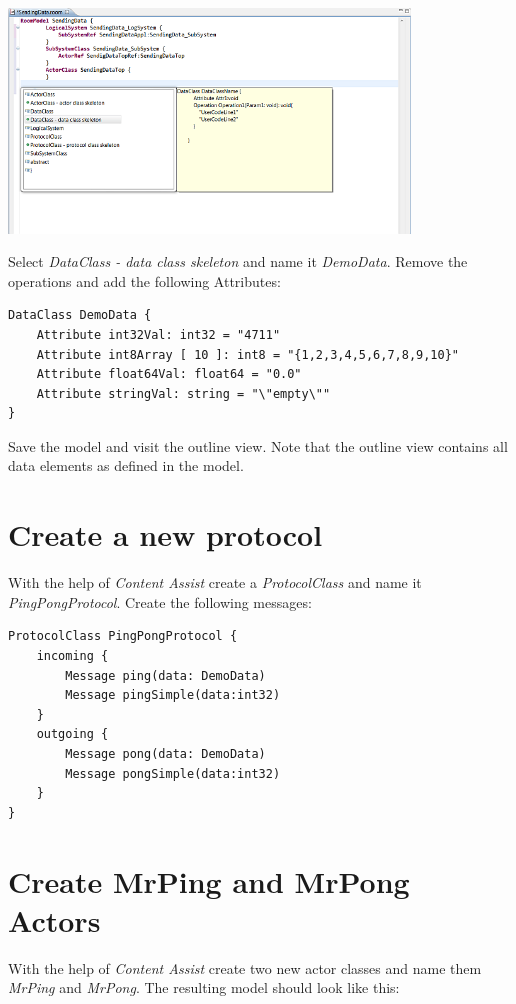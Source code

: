 \includegraphics[width=0.8\textwidth]{images/025-SendingData01.png}

Select \textit{DataClass - data class skeleton} and name it \textit{DemoData}.
Remove the operations and add the following Attributes:

\begin{verbatim}
DataClass DemoData {
    Attribute int32Val: int32 = "4711"
    Attribute int8Array [ 10 ]: int8 = "{1,2,3,4,5,6,7,8,9,10}"
    Attribute float64Val: float64 = "0.0"
    Attribute stringVal: string = "\"empty\""
}
\end{verbatim}

Save the model and visit the outline view.
Note that the outline view contains all data elements as defined in the model. 

\section{Create a new protocol}

With the help of \textit{Content Assist} create a \textit{ProtocolClass} and name it \textit{PingPongProtocol}. Create the following messages:

\begin{verbatim} 
ProtocolClass PingPongProtocol {
    incoming {
        Message ping(data: DemoData)
        Message pingSimple(data:int32)
    }
    outgoing {
        Message pong(data: DemoData)
        Message pongSimple(data:int32)
    }
}    
\end{verbatim}

\section{Create MrPing and MrPong Actors}

With the help of \textit{Content Assist} create two new actor classes and name them \textit{MrPing} and \textit{MrPong}. The resulting model should look like this:

